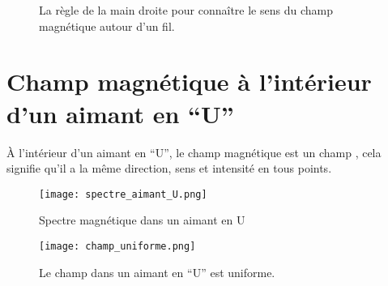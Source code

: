 
\begin{figure}[h!]
    \centering
    \resizebox{.4\linewidth}{!}
    {}
    \caption{La règle de la main droite pour connaître le sens du champ magnétique autour d'un fil.}
    \label{regle_main_droite_oersted}
\end{figure}



\newpage

\section{Champ magnétique à l'intérieur d'un aimant en \enquote{U}}
À l'intérieur d'un aimant en \enquote{U}, le champ magnétique est un champ , cela signifie qu'il a la même direction, sens et intensité en tous points.

\begin{figure}[!ht]
    \centering
    \texttt{[image: spectre\_aimant\_U.png]}
    \caption{Spectre magnétique dans un aimant en U}
    \label{spectre_aimant_U}
\end{figure}

\begin{figure}[ht]
    \centering
    \texttt{[image: champ\_uniforme.png]}
    \caption{Le champ dans un aimant en \enquote{U} est uniforme.}
    \label{champ_uniforme}
\end{figure}

\newpage

